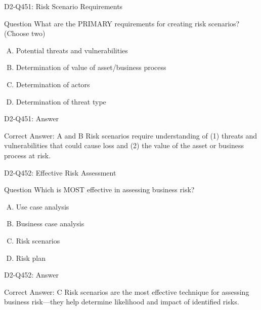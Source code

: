 \documentclass{beamer}
\begin{document}
\begin{frame}{D2-Q451: Risk Scenario Requirements}
	\begin{block}{Question}
		What are the PRIMARY requirements for creating risk scenarios? (Choose two)
	\end{block}
	\begin{enumerate}[(A)]
		\item Potential threats and vulnerabilities
		\item Determination of value of asset/business process
		\item Determination of actors
		\item Determination of threat type
	\end{enumerate}
\end{frame}
\begin{frame}{D2-Q451: Answer}
	\begin{block}{Correct Answer: A and B}
		Risk scenarios require understanding of (1) threats and vulnerabilities that could cause loss and (2) the value of the asset or business process at risk.
	\end{block}
\end{frame}

\begin{frame}{D2-Q452: Effective Risk Assessment}
	\begin{block}{Question}
		Which is MOST effective in assessing business risk?
	\end{block}
	\begin{enumerate}[(A)]
		\item Use case analysis
		\item Business case analysis
		\item Risk scenarios
		\item Risk plan
	\end{enumerate}
\end{frame}
\begin{frame}{D2-Q452: Answer}
	\begin{block}{Correct Answer: C}
		Risk scenarios are the most effective technique for assessing business risk—they help determine likelihood and impact of identified risks.
	\end{block}
\end{frame}
\end{document}
